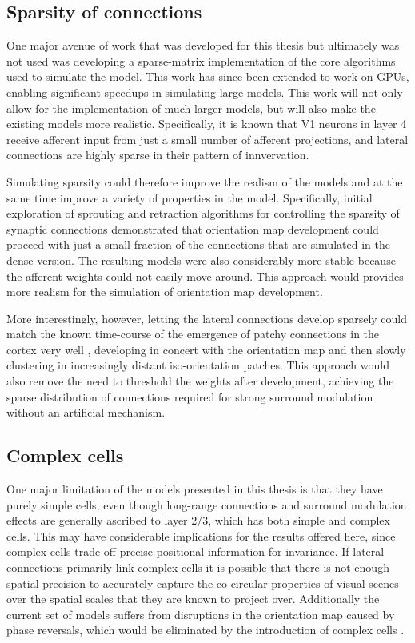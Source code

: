 \subsection{Sparsity of connections}

One major avenue of work that was developed for this thesis but
ultimately was not used was developing a sparse-matrix implementation
of the core algorithms used to simulate the model. This work has since
been extended to work on GPUs, enabling significant speedups in
simulating large models. This work will not only allow for the
implementation of much larger models, but will also make the existing models
more realistic. Specifically, it is known that V1 neurons in layer 4
receive afferent input from just a small number of afferent
projections, and lateral connections are highly sparse in their pattern
of innvervation.

Simulating sparsity could therefore improve the realism of the models
and at the same time improve a variety of properties in the
model. Specifically, initial exploration of sprouting and retraction
algorithms for controlling the sparsity of synaptic connections
demonstrated that orientation map development could proceed with just
a small fraction of the connections that are simulated in the dense
version.  The resulting models were also considerably more stable because
the afferent weights could not easily move around. This approach would
provides more realism for the simulation of orientation map development.

More interestingly, however, letting the lateral connections develop
sparsely could match the known time-course of the emergence of patchy
connections in the cortex very well \citep{Ruthazer1996}, developing in
concert with the orientation map and then slowly clustering in
increasingly distant iso-orientation patches. This approach would also remove
the need to threshold the weights after development, achieving the
sparse distribution of connections required for strong surround
modulation without an artificial mechanism.

\subsection{Complex cells}

One major limitation of the models presented in this thesis is that they
have purely simple cells, even though long-range connections
and surround modulation effects are generally ascribed to layer 2/3,
which has both simple and complex cells. This may have considerable
implications for the results offered here, since complex cells trade
off precise positional information for invariance. If lateral
connections primarily link complex cells it is possible that there is
not enough spatial precision to accurately capture the co-circular
properties of visual scenes over the spatial scales that they are
known to project over. Additionally the current set of models suffers
from disruptions in the orientation map caused by phase reversals,
which would be eliminated by the introduction of complex cells
\citep{Antolik2010}.

